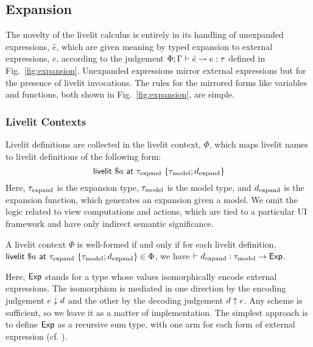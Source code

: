 \subsection{Expansion}\label{sec:calculus-expansion}

The novelty of the livelit calculus is entirely in its handling of unexpanded expressions,
$\hat e$, which are given meaning by typed expansion to external expressions,
$e$, according to the judgement $\Phi; \Gamma \vdash \hat e \leadsto e : \tau$
defined in Fig.~\ref{fig:expansion}.
Unexpanded expressions mirror external expressions but for the presence of livelit invocations.
The rules for the mirrored 
forms like variables and functions, both shown in Fig.~\ref{fig:expansion},
are simple.

\subsubsection{Livelit Contexts}\label{sec:livelit-contexts}

Livelit definitions are collected in the livelit context, $\Phi$, which
maps livelit names to livelit definitions of the following form:
\[ \mathsf{livelit}~\$a~\mathsf{at}~\tau_\text{expand}~\{\tau_\text{model}; d_\text{expand}\} \]
Here, $\tau_\text{expand}$ is the expansion type, $\tau_\text{model}$ is the model type,
and $d_\text{expand}$ is the expansion function, which generates an expansion given a model.
We omit the logic related to view computations and actions, which are tied to a particular 
UI framework and have only indirect semantic significance.

\begin{definition}
    A livelit context $\Phi$ is well-formed if and only if for each livelit definition,
    $\mathsf{livelit}~\$a~\mathsf{at}~\tau_\text{expand}~\{\tau_\text{model}; d_\text{expand}\} \in \Phi$,  we have
    $\vdash d_\text{expand} : \tau_\text{model} \rightarrow \mathsf{Exp}$.
\end{definition}
Here, $\mathsf{Exp}$ stands for a type whose values isomorphically encode
external expressions. The isomorphism is mediated in one direction by
the encoding judgement $e \downarrow d$ and the other by the decoding judgement $d \uparrow e$.
Any scheme is sufficient, so we leave it as a matter of implementation.
The simplest approach is to define $\mathsf{Exp}$ as a recursive sum type,
with one arm for each form of external expression (cf. \cite{TSLs}).

